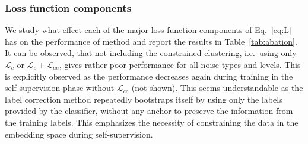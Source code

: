 \documentclass[runningheads, envcountsame, a4paper]{llncs}
\begin{document}
\subsubsection{Loss function components}
We study what effect each of the major loss function components of  Eq.~\ref{eq:L} has on the performance of \acrshort{method} and report the results in Table~\ref{tab:abation}.
It can be observed, that not including the constrained clustering, i.e.\ using only $\mathcal{L}_c$ or $\mathcal{L}_c+\mathcal{L}_{ae}$, gives rather poor performance for all noise types and levels. This is explicitly observed as the performance decreases again during training in the self-supervision phase without $\mathcal{L}_{cc}$  (not shown). 
This seems understandable as the label correction method repeatedly bootstraps itself by using only the labels provided by the classifier, without any anchor to preserve the information from the training labels.  
This emphasizes the necessity of constraining the data in the embedding space during self-supervision.  
\end{document}
